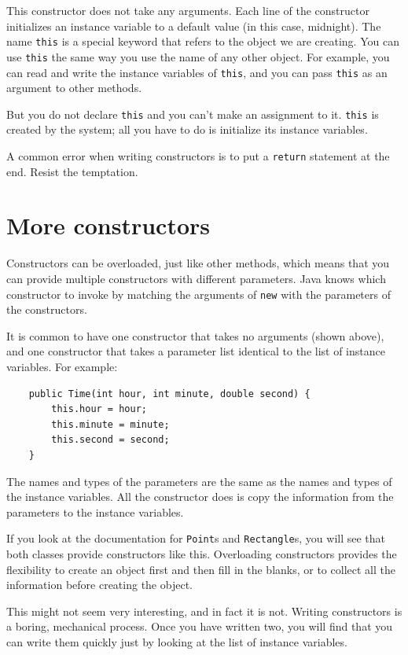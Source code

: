 This constructor does not take any arguments.  Each line of the
constructor initializes an instance variable to a default
value (in this case, midnight).  The name {\tt this} is a special
keyword that refers to the object we are creating.  You can use
{\tt this} the same way you use the name of any other object.  For
example, you can read and write the instance variables of {\tt this},
and you can pass {\tt this} as an argument to other methods.


But you do not declare {\tt this} and you can't make an
assignment to it.  {\tt this} is created by the system; all you
have to do is initialize its instance variables.

A common error when writing constructors is to put a {\tt return}
statement at the end.  Resist the temptation.


\section{More constructors}

Constructors can be overloaded, just like other methods,
which means that you can provide multiple constructors
with different parameters.  Java knows which constructor
to invoke by matching the arguments of {\tt new}
with the parameters of the constructors.

It is common to have one constructor that takes no
arguments (shown above), and one constructor that takes
a parameter list identical to the list of instance
variables.  For example:

\begin{lstlisting}
    public Time(int hour, int minute, double second) {
        this.hour = hour;
        this.minute = minute;
        this.second = second;
    }
\end{lstlisting}
%
The names and types of the parameters are the same as
the names and types of the instance variables.  All the
constructor does is copy the information from the parameters
to the instance variables.

If you look at the documentation for {\tt Point}s
and {\tt Rectangle}s, you will see that both classes provide
constructors like this.  Overloading constructors provides the
flexibility to create an object first and then fill in the
blanks, or to collect all the information before creating
the object.

This might not seem very interesting, and in fact it
is not.  Writing constructors is a boring, mechanical process.
Once you have written two, you will find that you can write them
quickly just by looking at the list of instance
variables.


